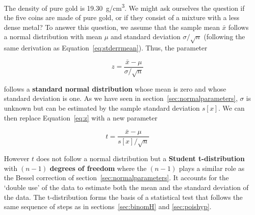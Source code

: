The density of pure gold is 19.30~g/cm\textsuperscript{3}. We might
ask ourselves the question if the five coins are made of pure gold, or
if they consist of a mixture with a less dense metal? To answer this
question, we assume that the sample mean $\bar{x}$ follows a normal
distribution with mean $\mu$ and standard deviation $\sigma/\sqrt{n}$
(following the same derivation as Equation~\ref{eq:stderrmean}). Thus,
the parameter

\begin{equation}
  z = \frac{\bar{x}-\mu}{\sigma/\sqrt{n}}
  \label{eq:z}
\end{equation}

\noindent follows a \textbf{standard normal distribution} whose mean
is zero and whose standard deviation is one. As we have seen in
section~\ref{sec:normalparameters}, $\sigma$ is unknown but can be
estimated by the sample standard deviation $s[x]$. We can then
replace Equation~\ref{eq:z} with a new parameter

\begin{equation}
  t = \frac{\bar{x}-\mu}{s[x]/\sqrt{n}}
  \label{eq:t}
\end{equation}

However $t$ does not follow a normal distribution but a
\textbf{Student t-distribution} with $(n-1)$ \textbf{degrees of
  freedom} where the $(n-1)$ plays a similar role as the Bessel
correction of section~\ref{sec:normalparameters}. It accounts for the
`double use' of the data to estimate both the mean and the standard
deviation of the data. The t-distribution forms the basis of a
statistical test that follows the same sequence of steps as in
sections~\ref{sec:binomH} and \ref{sec:poishyp}.


